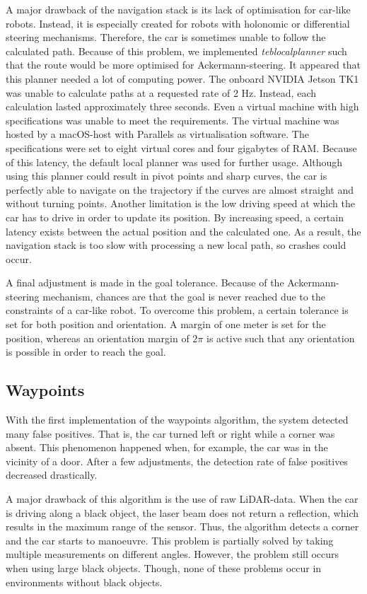 \documentclass[conference,a4paper]{IEEEtran}
\begin{document}
A major drawback of the navigation stack is its lack of optimisation for car-like robots. Instead, it is especially created for robots with holonomic or differential steering mechanisms. Therefore, the car is sometimes unable to follow the calculated path. Because of this problem, we implemented \emph{teb\textunderscore local\textunderscore planner} such that the route would be more optimised for Ackermann-steering. It appeared that this planner needed a lot of computing power. The onboard NVIDIA Jetson TK1 was unable to calculate paths at a requested rate of 2 Hz. Instead, each calculation lasted approximately three seconds. Even a virtual machine with high specifications was unable to meet the requirements. The virtual machine was hosted by a macOS-host with Parallels as virtualisation software. The specifications were set to eight virtual cores and four gigabytes of RAM. Because of this latency, the default local planner was used for further usage. Although using this planner could result in pivot points and sharp curves, the car is perfectly able to navigate on the trajectory if the curves are almost straight and without turning points.
Another limitation is the low driving speed at which the car has to drive in order to update its position. By increasing speed, a certain latency exists between the actual position and the calculated one. As a result, the navigation stack is too slow with processing a new local path, so crashes could occur.

A final adjustment is made in the goal tolerance. Because of the Ackermann-steering mechanism, chances are that the goal is never reached due to the constraints of a car-like robot. To overcome this problem, a certain tolerance is set for both position and orientation. A margin of one meter is set for the position, whereas an orientation margin of $2\pi$ is active such that any orientation is possible in order to reach the goal.

\subsection{Waypoints}
With the first implementation of the waypoints algorithm, the system detected many false positives. That is, the car turned left or right while a corner was absent. This phenomenon happened when, for example, the car was in the vicinity of a door. After a few adjustments, the detection rate of false positives decreased drastically. 

A major drawback of this algorithm is the use of raw LiDAR-data. When the car is driving along a black object, the laser beam does not return a reflection, which results in the maximum range of the sensor. Thus, the algorithm detects a corner and the car starts to manoeuvre. This problem is partially solved by taking multiple measurements on different angles. However, the problem still occurs when using large black objects. Though, none of these problems occur in environments without black objects. 
\end{document}
